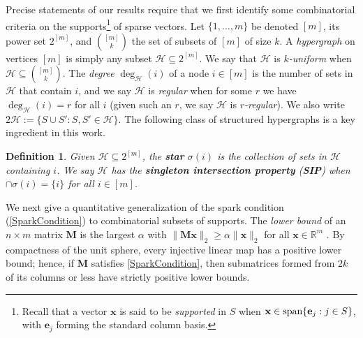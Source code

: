 \documentclass[journal, twocolumn]{IEEEtran}
\newtheorem{definition}{Definition}
\begin{document}
Precise statements of our results require that we first identify some combinatorial criteria on the supports\footnote{Recall that a vector $\mathbf{x}$ is said to be \emph{supported} in $S$ when $\mathbf{x} \in \text{\rm span}\{\mathbf{e}_j: j\in S\}$, with $\mathbf{e}_j$ forming the standard column basis.} of sparse vectors. Let $\{1, \ldots, m\}$ be denoted $[m]$, its power set $2^{[m]}$, and ${[m] \choose k}$ the set of subsets of $[m]$ of size $k$.  A \emph{hypergraph} on vertices $[m]$  is simply any subset $\mathcal{H} \subseteq 2^{[m]}$. We say that $\mathcal{H}$ is \textit{$k$-uniform} when $\mathcal{H} \subseteq {[m] \choose k}$. The \emph{degree} $\deg_\mathcal{H}(i)$ of a node $i \in [m]$ is the number of sets in $\mathcal{H}$ that contain $i$, and we say $\mathcal{H}$ is \emph{regular} when for some $r$ we have $\deg_\mathcal{H}(i) = r$ for all $i$ (given such an $r$, we say $\mathcal{H}$ is \textit{$r$-regular}). We also write $2\mathcal{H} := \{ S \cup S': S, S' \in \mathcal{H}\}$.  The following class of structured hypergraphs is a key ingredient in this work.

\begin{definition}\label{sip}
Given $\mathcal{H} \subseteq 2^{[m]}$, the \textbf{star} $\sigma(i)$ is the collection of sets in $\mathcal{H}$ containing $i$. We say $\mathcal{H}$ has the \textbf{singleton intersection property} (\textbf{SIP}) when $\cap \sigma(i) = \{i\}$ for all $i \in [m]$. 
\end{definition}

We next give a quantitative generalization of the spark condition (\ref{SparkCondition}) to combinatorial subsets of supports. The \emph{lower bound} of an $n \times m$ matrix $\mathbf{M}$ is the largest $\alpha$ with \mbox{$\|\mathbf{M}\mathbf{x}\|_2 \geq \alpha\|\mathbf{x}\|_2$} for all $\mathbf{x} \in \mathbb{R}^m$ \cite{Grcar10}. By compactness of the unit sphere, every injective linear map has a positive lower bound; hence, if $\mathbf{M}$ satisfies \eqref{SparkCondition}, then submatrices formed from $2k$ of its columns or less have strictly positive lower bounds. 
\end{document}
